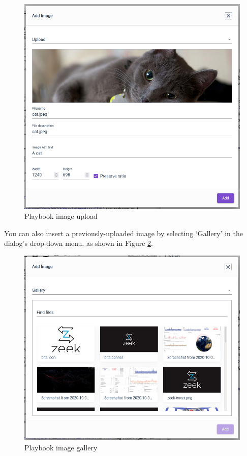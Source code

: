 \begin{figure}[H]
	\includegraphics[width=0.6\linewidth]{images/playbook-upload2.png}
	\caption{Playbook image upload}
	\label{fig:playbook-upload2}
\end{figure}

You can also insert a previously-uploaded image by selecting `Gallery' in the dialog's drop-down menu, as shown in Figure \ref{fig:playbook-gallery}.

\begin{figure}[H]
	\includegraphics[width=0.6\linewidth]{images/playbook-gallery.png}
	\caption{Playbook image gallery}
	\label{fig:playbook-gallery}
\end{figure}
